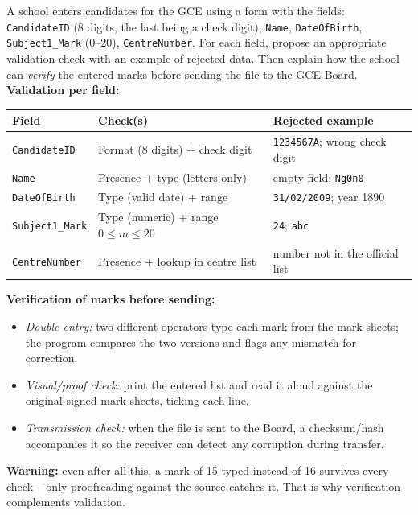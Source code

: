 \documentclass[11pt]{article}
\newcommand{\cle}[1]{{\popxbold\color{popdark}#1}}
\begin{document}
\begin{exoresolu}
A school enters candidates for the GCE using a form with the fields: \texttt{CandidateID} (8 digits, the last being a check digit), \texttt{Name}, \texttt{DateOfBirth}, \texttt{Subject1\_Mark} (0--20), \texttt{CentreNumber}. For each field, propose an appropriate validation check with an example of rejected data. Then explain how the school can \emph{verify} the entered marks before sending the file to the GCE Board.
\tcblower
\textbf{Validation per field:}
\begin{center}
\begin{tabularx}{\linewidth}{|l|X|X|}
\hline
\rowcolor{popblueL} Field & Check(s) & Rejected example \\ \hline
\texttt{CandidateID} & Format (8 digits) + \cle{check digit} & \texttt{1234567A}; wrong check digit \\ \hline
\texttt{Name} & Presence + type (letters only) & empty field; \texttt{Ng0n0} \\ \hline
\texttt{DateOfBirth} & Type (valid date) + range & \texttt{31/02/2009}; year 1890 \\ \hline
\texttt{Subject1\_Mark} & Type (numeric) + range $0\le m\le 20$ & \texttt{24}; \texttt{abc} \\ \hline
\texttt{CentreNumber} & Presence + lookup in centre list & number not in the official list \\ \hline
\end{tabularx}
\end{center}
\textbf{Verification of marks before sending:}
\begin{itemize}
\item \emph{Double entry:} two different operators type each mark from the mark sheets; the program compares the two versions and flags any mismatch for correction.
\item \emph{Visual/proof check:} print the entered list and read it aloud against the original signed mark sheets, ticking each line.
\item \emph{Transmission check:} when the file is sent to the Board, a checksum/hash accompanies it so the receiver can detect any corruption during transfer.
\end{itemize}
\textbf{Warning:} even after all this, a mark of 15 typed instead of 16 survives every check -- only proofreading against the source catches it. That is why verification complements validation.
\end{exoresolu}
\end{document}
